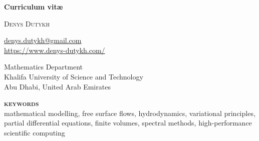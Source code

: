 \begin{titlepage}
    \vspace*{2cm}
    \begin{center}
        \Huge
        \textbf{Curriculum vit\ae} \\
    \end{center}
    \vspace*{2.7cm}
    \begin{center}
        \Large
        \textsc{Denys Dutykh}
    \end{center}
    \vspace*{0.5em}
    \begin{center}
        \large
        \href{mailto:denys.dutykh@gmail.com}{denys.dutykh@gmail.com} \\
        \url{https://www.denys-dutykh.com/}
    \end{center}
    \vspace*{0.5em}
    \begin{center}
        \large
        Mathematics Department \\
        Khalifa University of Science and Technology \\
        Abu Dhabi, United Arab Emirates
    \end{center}
    \vfill
    \begin{center}
        \textbf{\textsc{keywords}}\\[5mm]
        mathematical modelling, free surface flows, hydrodynamics, variational principles, partial differential equations, finite volumes, spectral methods, high-performance scientific computing
    \end{center}
\end{titlepage}